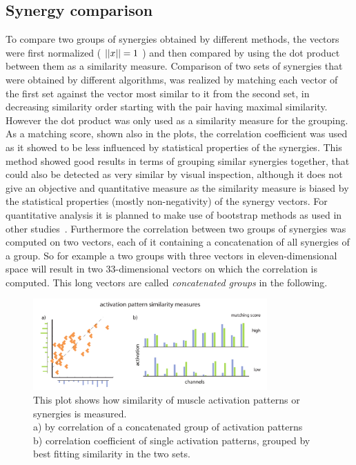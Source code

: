 \subsection{Synergy comparison} %
\label{sg:sub:comp}
To compare two groups of synergies obtained by different methods, the vectors were first normalized ( $\left|\left|x\right|\right| = 1$ ) and then compared by using the dot product between them as a similarity measure. Comparison of two sets of synergies that were obtained by different algorithms, was realized by matching each vector of the first set against the vector most similar to it from the second set, in decreasing similarity order starting with the pair having maximal similarity. However the dot product was only used as a similarity measure for the grouping. As a matching score, shown also in the plots, the correlation coefficient was used as it showed to be less influenced by statistical properties of the synergies. This method showed good results in terms of grouping similar synergies together, that could also be detected as very similar by visual inspection, although it does not give an objective and quantitative measure as the similarity measure is biased by the statistical properties (mostly non-negativity) of the synergy vectors. For quantitative analysis it is planned to make use of bootstrap methods as used in other studies~\citet{AdAvella:2005p2330}. Furthermore the correlation between two groups of synergies was computed on two vectors, each of it containing a concatenation of all synergies of a group. So for example a two groups with three vectors in eleven-dimensional space will result in two 33-dimensional vectors on which the correlation is computed. This long vectors are called \emph{concatenated groups} in the following.
\begin{figure}[ht]
	\centering
		\includegraphics[width=0.8\textwidth]{images/match_explanation.pdf}
	\caption{
This plot shows how similarity of muscle activation patterns or synergies is measured. \\ a) by correlation of a concatenated group of activation patterns \\
b) correlation coefficient of single activation patterns, grouped by best fitting similarity in the two sets. }
	\label{sg:fig:images_match_explanation}
\end{figure}

